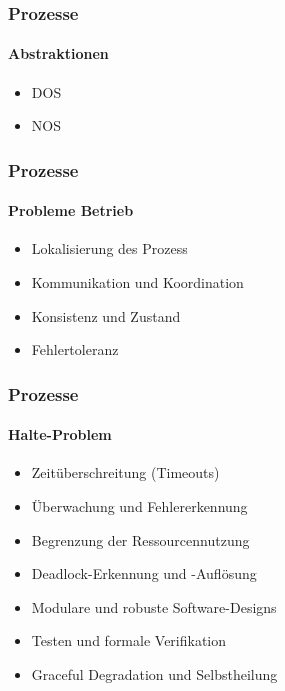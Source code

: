 \begin{frame}
  \frametitle{Prozesse}
  \framesubtitle{Abstraktionen}
  \begin{itemize}
    \item DOS
    \item NOS
  \end{itemize}
\end{frame}

\begin{frame}
  \frametitle{Prozesse}
  \framesubtitle{Probleme Betrieb}
  \begin{itemize}
    \item Lokalisierung des Prozess
    \item Kommunikation und Koordination
    \item Konsistenz und Zustand
    \item Fehlertoleranz
  \end{itemize}
\end{frame}

\begin{frame}
  \frametitle{Prozesse}
  \framesubtitle{Halte-Problem}
  \begin{itemize}
    \item Zeitüberschreitung (Timeouts)
    \item Überwachung und Fehlererkennung
    \item Begrenzung der Ressourcennutzung
    \item Deadlock-Erkennung und -Auflösung
    \item Modulare und robuste Software-Designs
    \item Testen und formale Verifikation
    \item Graceful Degradation und Selbstheilung
  \end{itemize}
\end{frame}